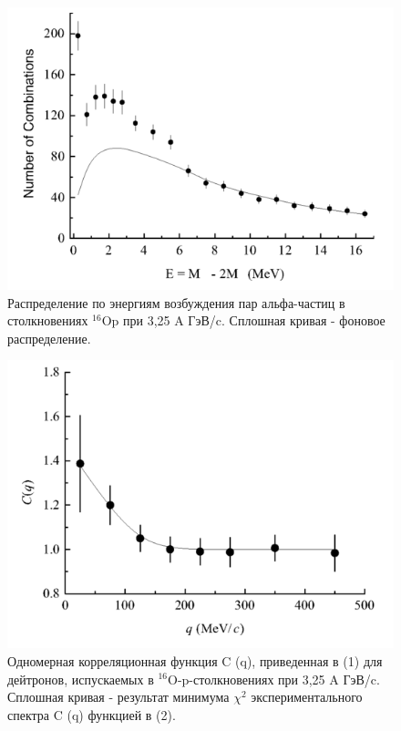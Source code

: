 \documentclass[fontsize=14pt]{scrreport}
\begin{document}
\begin{figure}[!ht]
\centerline{\includegraphics[scale=.5]{picture7.png}}
\caption{Распределение по энергиям возбуждения пар альфа-частиц в столкновениях $^{16}$Op при 3,25 A ГэВ/c. Сплошная кривая - фоновое распределение.}
\label{fig1891}
\end{figure}

\begin{figure}[!ht]
\centerline{\includegraphics[scale=.5]{picture9.png}}
\caption{Одномерная корреляционная функция C (q), приведенная в (1) для дейтронов, испускаемых в $^{16}$O-p-столкновениях при 3,25 A ГэВ/c. Сплошная кривая - результат минимума $\chi^{2}$ экспериментального спектра C (q) функцией в (2).}
\label{fig131}
\end{figure}
  
\end{document}
